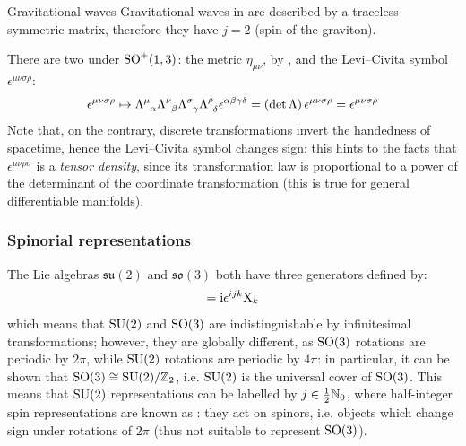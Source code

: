 \begin{example}{Gravitational waves}{}
  Gravitational waves in  are described by a traceless symmetric matrix, therefore they have $ j = 2 $ (spin of the graviton).
\end{example}

There are two  under $ \mathrm{SO}^+(1,3) $: the metric $ \eta_{\mu \nu} $, by , and the Levi--Civita symbol $ \epsilon^{\mu \nu \sigma \rho} $:
\begin{equation*}
  \epsilon^{\mu \nu \sigma \rho} \mapsto \tensor{\Lambda}{^\mu_\alpha} \tensor{\Lambda}{^\nu_\beta} \tensor{\Lambda}{^\sigma_\gamma} \tensor{\Lambda}{^\rho_\delta} \epsilon^{\alpha \beta \gamma \delta} = \left( \det \Lambda \right) \epsilon^{\mu \nu \sigma \rho} = \epsilon^{\mu \nu \sigma \rho}
\end{equation*}
Note that, on the contrary, discrete transformations invert the handedness of spacetime, hence the Levi--Civita symbol changes sign: this hints to the facts that $ \epsilon^{\mu \nu \rho \sigma} $ is a \emph{tensor density}, since its transformation law is proportional to a power of the determinant of the coordinate transformation (this is true for general differentiable manifolds).

\subsubsection{Spinorial representations}

The Lie algebras $ \mathfrak{su}(2) $ and $ \mathfrak{so}(3) $ both have three generators defined by:
\begin{equation}
  [\mt{X}_i , \mt{X}_j] = \img \epsilon^{ijk} \mt{X}_k
\end{equation}
which means that $ \mathrm{SU}(2) $ and $ \mathrm{SO}(3) $ are indistinguishable by infinitesimal transformations; however, they are globally different, as $ \mathrm{SO}(3) $ rotations are periodic by $ 2\pi $, while $ \mathrm{SU}(2) $ rotations are periodic by $ 4\pi $: in particular, it can be shown that $ \mathrm{SO}(3) \cong \mathrm{SU}(2) / \mathbb{Z}_2 $, i.e. $ \mathrm{SU}(2) $ is the universal cover of $ \mathrm{SO}(3) $. This means that $ \mathrm{SU}(2) $ representations can be labelled by $ j \in \frac{1}{2} \mathbb{N}_0 $, where half-integer spin representations are known as : they act on spinors, i.e. objects which change sign under rotations of $ 2\pi $ (thus not suitable to represent $ \mathrm{SO}(3) $).

